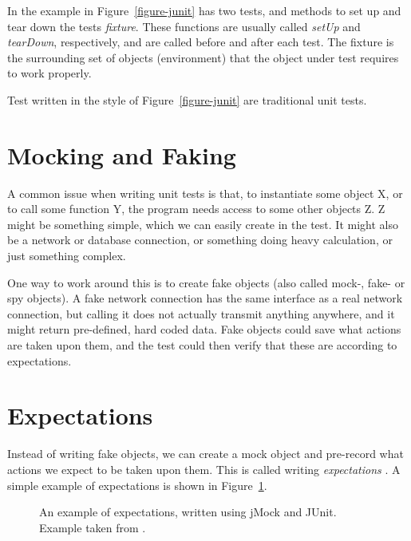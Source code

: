 \documentclass[a4paper,11pt]{kth-mag}
\begin{document}
In the example in Figure~\ref{figure-junit} has two tests, and methods to set
up and tear down the tests \textit{fixture}. These functions are usually called
\textit{setUp} and \textit{tearDown}, respectively, and are called before and
after each test. The fixture is the surrounding set of objects (environment)
that the object under test requires to work properly.

Test written in the style of Figure~\ref{figure-junit} are traditional unit
tests.


\section{Mocking and Faking} \label{section-mocking}

A common issue when writing unit tests is that, to instantiate some object X,
or to call some function Y, the program needs access to some other objects Z. Z
might be something simple, which we can easily create in the test. It might
also be a network or database connection, or something doing heavy calculation,
or just something complex.

One way to work around this is to create fake objects (also called mock-, fake-
or spy objects). A fake network connection has the same interface as a real
network connection, but calling it does not actually transmit anything
anywhere, and it might return pre-defined, hard coded data. Fake objects could
save what actions are taken upon them, and the test could then verify that
these are according to expectations.


\section{Expectations} \label{section-expectations}

Instead of writing fake objects, we can create a mock object and pre-record
what actions we expect to be taken upon them. This is called writing
\textit{expectations} \cite{fowler07expectations}. A simple example of
expectations is shown in Figure~\ref{figure-expectations}.

\begin{figure}[h!]
	\begin{center}
	\begin{minipage}{0.9\textwidth}
		\lstset{language=Java}
		
	\end{minipage}
	\end{center}

	\caption{An example of expectations, written using jMock and JUnit.
	Example taken from \cite{fowler07expectations}.}
	\label{figure-expectations}
\end{figure}
\end{document}
